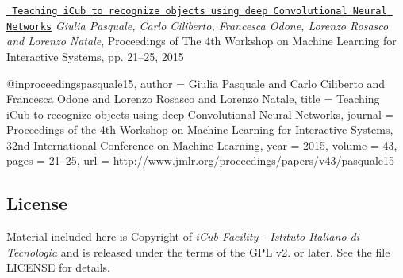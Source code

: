 \href{http://jmlr.csail.mit.edu/proceedings/papers/v43/pasquale15.pdf}{\texttt{ Teaching i\+Cub to recognize objects using deep Convolutional Neural Networks}} {\itshape Giulia Pasquale, Carlo Ciliberto, Francesca Odone, Lorenzo Rosasco and Lorenzo Natale}, Proceedings of The 4th Workshop on Machine Learning for Interactive Systems, pp. 21–25, 2015 \begin{DoxyVerb}@inproceedings{pasquale15,
author  = {Giulia Pasquale and Carlo Ciliberto and Francesca Odone and Lorenzo Rosasco and Lorenzo Natale},
title   = {Teaching iCub to recognize objects using deep Convolutional Neural Networks},
journal = {Proceedings of the 4th Workshop on Machine Learning for Interactive Systems, 32nd International Conference on Machine Learning},
year    = {2015},
volume  = {43},
pages   = {21--25},
url     = {http://www.jmlr.org/proceedings/papers/v43/pasquale15}
}
\end{DoxyVerb}


\subsection*{License}

Material included here is Copyright of {\itshape i\+Cub Facility -\/ Istituto Italiano di Tecnologia} and is released under the terms of the G\+PL v2. or later. See the file L\+I\+C\+E\+N\+SE for details. 